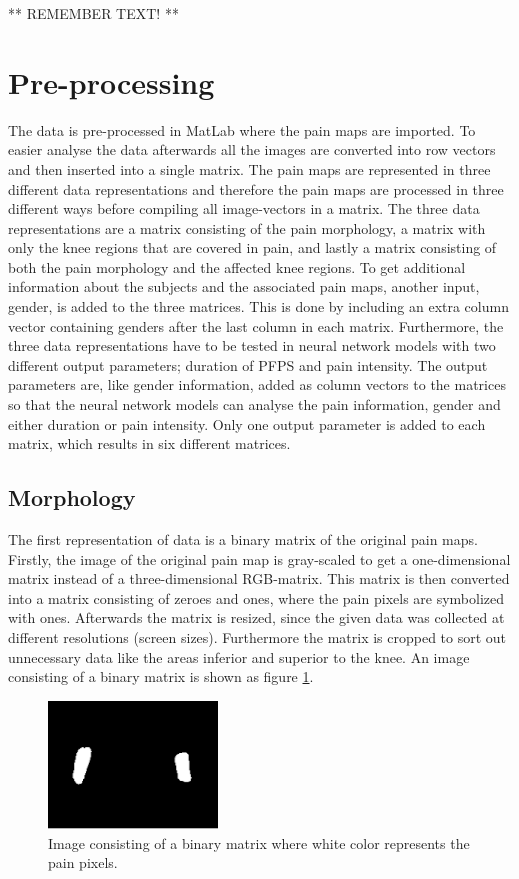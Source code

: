 ** REMEMBER TEXT! **

\section{Pre-processing}
The data is pre-processed in MatLab where the pain maps are imported. To easier analyse the data afterwards all the images are converted into row vectors and then inserted into a single matrix. The pain maps are represented in three different data representations and therefore the pain maps are processed in three different ways before compiling all image-vectors in a matrix. 
The three data representations are a matrix consisting of the pain morphology, a matrix with only the knee regions that are covered in pain, and lastly a matrix consisting of both the pain morphology and the affected knee regions. 
To get additional information about the subjects and the associated pain maps, another input, gender, is added to the three matrices. This is done by including an extra column vector containing genders after the last column in each matrix. 
Furthermore, the three data representations have to be tested in neural network models with two different output parameters; duration of PFPS and pain intensity. The output parameters are, like gender information, added as column vectors to the matrices so that the neural network models can analyse the pain information, gender and either duration or pain intensity. Only one output parameter is added to each matrix, which results in six different matrices.

\subsection{Morphology} \label{sec:Morph}
The first representation of data is a binary matrix of the original pain maps. 
Firstly, the image of the original pain map is gray-scaled to get a one-dimensional matrix instead of a three-dimensional RGB-matrix. This matrix is then converted into a matrix consisting of zeroes and ones, where the pain pixels are symbolized with ones. Afterwards the matrix is resized, since the given data was collected at different resolutions (screen sizes). Furthermore the matrix is cropped to sort out unnecessary data like the areas inferior and superior to the knee. An image consisting of a binary matrix is shown as figure \ref{fig:cropbin7}.

\begin{figure} [H]
\centering
\includegraphics[width=0.4\textwidth]{figures/cropbin7}
\caption{Image consisting of a binary matrix where white color represents the pain pixels.}
\label{fig:cropbin7}
\end{figure}


